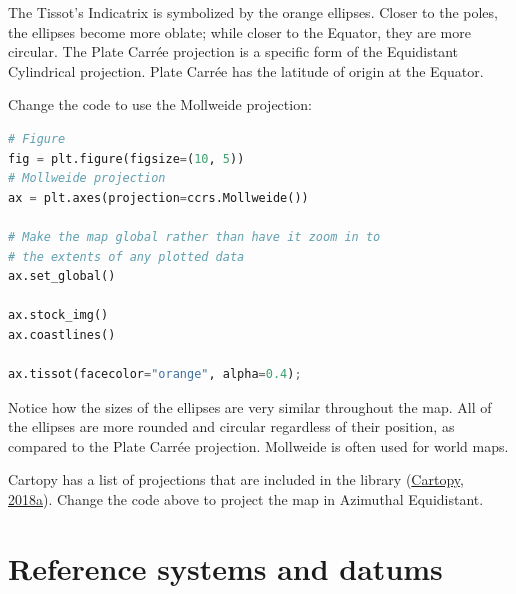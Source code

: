 \documentclass[a4paper , 12pt]{book}
\begin{document}
The Tissot’s Indicatrix is symbolized by the orange ellipses. Closer to the poles, the ellipses become more oblate; while closer to the Equator, they are more circular. The Plate Carrée projection is a specific form of the Equidistant Cylindrical projection. Plate Carrée has the latitude of origin at the Equator.

Change the code to use the Mollweide projection:

\begin{center}
\begin{lstlisting}[language=Python, frame=single]
# Figure
fig = plt.figure(figsize=(10, 5))
# Mollweide projection
ax = plt.axes(projection=ccrs.Mollweide())

# Make the map global rather than have it zoom in to
# the extents of any plotted data
ax.set_global()

ax.stock_img()
ax.coastlines()

ax.tissot(facecolor="orange", alpha=0.4);
\end{lstlisting}
\end{center}

Notice how the sizes of the ellipses are very similar throughout the map. All of the ellipses are more rounded and circular regardless of their position, as compared to the Plate Carrée projection. Mollweide is often used for world maps.

Cartopy has a list of projections that are included in the library  (\href{https://scitools.org.uk/cartopy/docs/latest/crs/projections.html}{Cartopy, 2018a}). Change the code above to project the map in Azimuthal Equidistant. 

\section{Reference systems and datums}
\end{document}

